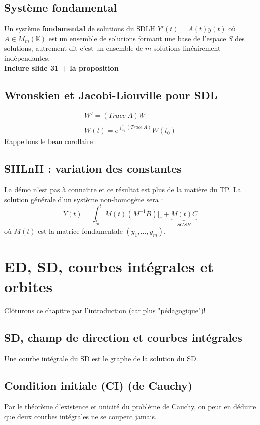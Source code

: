 \documentclass[11pt, a4paper, openany]{book}
\begin{document}
\subsection{Système fondamental}
Un système \textbf{fondamental} de solutions du SDLH $Y'(t) = A(t)y(t)$ où $A \in M_m(\mathbb{K})$ est un ensemble de solutions formant une base de l'espace $S$ des solutions, autrement dit c'est un ensemble de $m$ solutions linéairement indépendantes.\\
\textbf{Inclure slide 31  + la proposition}
		
\subsection{Wronskien et Jacobi-Liouville pour SDL}
\begin{eqnarray}
	W' = (Trace\ A)W\\
	W(t) = e^{\int_{t_0}^t (Trace\ A)}W(t_0)
\end{eqnarray}
Rappellons le beau corollaire :\\
		
\subsection{SHLnH : variation des constantes}
La démo n'est pas à connaître et ce résultat est plus de la matière du TP. La solution générale d'un système non-homogène sera :
\begin{equation}
	Y(t) = \int_{t_0}^t M(t)(M^{-1}B)|_s + \underbrace{M(t)C}_{SGSH}
\end{equation}
où $M(t)$ est la matrice fondamentale $(y_1,\dots,y_m)$.
		
\setcounter{section}{0}
\section{ED, SD, courbes intégrales et orbites}
Clôturons ce chapitre par l'introduction (car plus "pédagogique")! 
\subsection{SD, champ de direction et courbes intégrales}
Une courbe intégrale du SD est le graphe de la solution du SD.
		
\subsection{Condition initiale (CI) (de Cauchy)}
Par le théorème d'existence et unicité du problème de Cauchy, on peut en déduire que deux courbes intégrales ne se coupent jamais.
		
\end{document}
